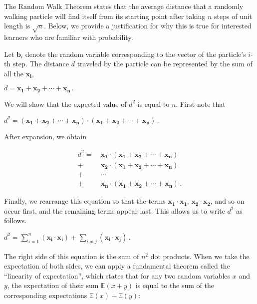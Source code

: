 \documentclass{article}
\begin{document}
The Random Walk Theorem states that the average distance that a randomly walking particle will find itself from its starting point after taking $n$ steps of unit length is $\sqrt{n}$. Below, we provide a justification for why this is true for interested learners who are familiar with probability.

Let $\mathbf{b}_i$ denote the random variable corresponding to the vector of the particle's $i$-th step.  The distance $d$ traveled by the particle can be represented by the sum of all the $\mathbf{x_i}$,

\begin{center}
$d = \mathbf{x_1} + \mathbf{x_2} + \cdots + \mathbf{x_n} \,.$
\end{center}

We will show that the expected value of $d^2$ is equal to $n$. First note that

\begin{center}
$d^2 = (\mathbf{x_1} + \mathbf{x_2} + \cdots + \mathbf{x_n}) \cdot (\mathbf{x_1} + \mathbf{x_2} + \cdots + \mathbf{x_n})\,.$
\end{center}

\noindent After expansion, we obtain
\begin{center}
\begin{align*}
d^2 = ~ & \mathbf{x_1} \cdot (\mathbf{x_1} + \mathbf{x_2} + \cdots + \mathbf{x_n})\\
+ & \mathbf{x_2} \cdot (\mathbf{x_1} + \mathbf{x_2} + \cdots + \mathbf{x_n})\\
+ & \cdots\\
+ & \mathbf{x_n} \cdot (\mathbf{x_1} + \mathbf{x_2} + \cdots + \mathbf{x_n}) \,.
\end{align*}
\end{center}

Finally, we rearrange this equation so that the terms $\mathbf{x_1} \cdot \mathbf{x_1}$, $\mathbf{x_2} \cdot \mathbf{x_2}$, and so on occur first, and the remaining terms appear last. This allows us to write $d^2$ as follows.

\begin{center}
$d^2 = \sum_{i=1}^n (\mathbf{x_i} \cdot \mathbf{x_i}) + \sum_{i \neq j} (\mathbf{x_i} \cdot \mathbf{x_j})\, .$
\end{center}

The right side of this equation is the sum of $n^2$ dot products.  When we take the expectation of both sides, we can apply a fundamental theorem called the ``linearity of expectation'', which states that for any two random variables $x$ and $y$, the expectation of their sum $\mathbb{E}(x + y)$ is equal to the sum of the corresponding expectations $\mathbb{E}(x) + \mathbb{E}(y)$:
\end{document}
